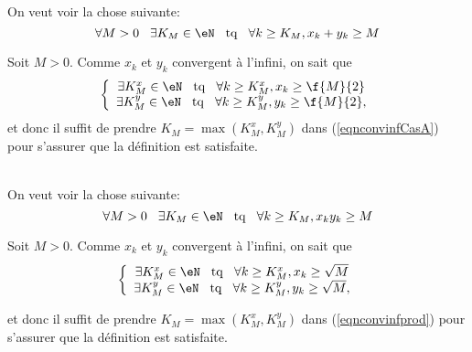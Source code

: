 \noindent On veut voir  la chose suivante:
\begin{equation}\label{eqnconvinfCasA}
   \forall M > 0 \hspace{0.3cm} \exists K_M \in \eN \hspace{0.3cm} {\rm tq} \hspace{0.3cm} \forall k \geq K_M, x_k + y_k \geq M
  \end{equation}

\noindent Soit $M> 0$. Comme $x_k$ et $y_k$ convergent à l'infini, on sait que
\[\left\{\begin{array}{c}
         \exists K^x_M \in \eN \hspace{0.3cm} {\rm tq} \hspace{0.3cm} \forall k \geq K^x_M, x_k \geq \f{M}{2}\\
        \exists K^y_M \in \eN \hspace{0.3cm} {\rm tq} \hspace{0.3cm} \forall k \geq K^y_M, y_k \geq \f{M}{2},
\end{array}\right.\]
et donc il suffit de prendre $K_M = \max(K_M^x, K_M^y)$ dans (\ref{eqnconvinfCasA}) pour s'assurer que la définition est satisfaite.


\vspace{0.5cm}
\\

\noindent On veut voir la chose suivante:
\begin{equation}
 \label{eqnconvinfprod}  \forall M > 0 \hspace{0.3cm} \exists K_M \in \eN \hspace{0.3cm} {\rm tq} \hspace{0.3cm} \forall k \geq K_M, x_k  y_k \geq M \end{equation}

\noindent Soit $M> 0$. Comme $x_k$ et $y_k$ convergent à l'infini, on sait que
\[\left\{\begin{array}{c}
         \exists K^x_M \in \eN \hspace{0.3cm} {\rm tq} \hspace{0.3cm} \forall k \geq K^x_M, x_k \geq \sqrt M\\
        \exists K^y_M \in \eN \hspace{0.3cm} {\rm tq} \hspace{0.3cm} \forall k \geq K^y_M, y_k \geq \sqrt M,
\end{array}\right.\]

\noindent et donc il suffit  de prendre  $K_M = \max(K_M^x, K_M^y)$ dans (\ref{eqnconvinfprod}) pour s'assurer que la définition est satisfaite.

